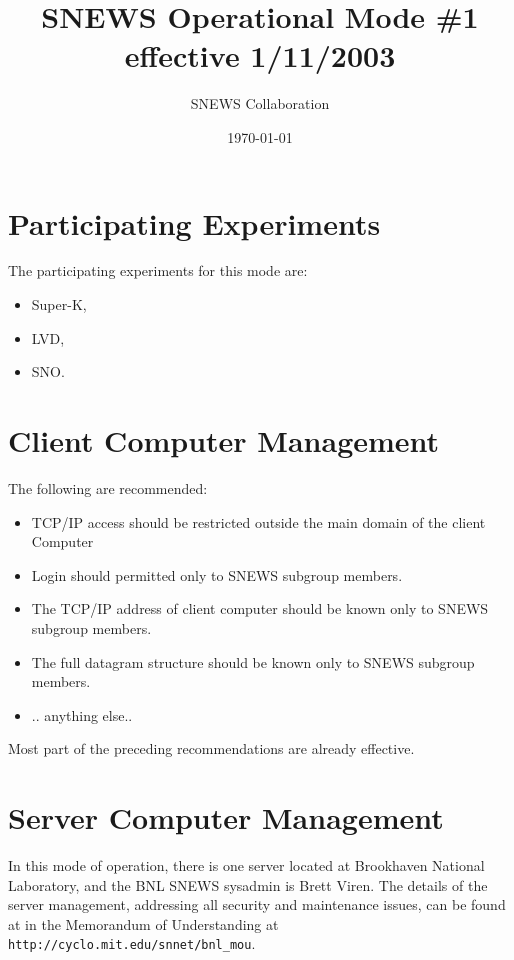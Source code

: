 \documentclass{article}
\begin{document}
\title{SNEWS Operational Mode \#1 effective 1/11/2003}         
\author{SNEWS Collaboration}
\date{\today}
\maketitle

\section{Participating Experiments}

The participating experiments for this mode are:

\begin{itemize}
\item Super-K,
\item LVD,
\item SNO.
\end{itemize}

\section{Client Computer Management}

The following are recommended:

\begin{itemize}
\item TCP/IP access should be restricted outside the main domain of the client Computer
\item Login should permitted only to SNEWS subgroup members.
\item The TCP/IP address of client computer should be known only to SNEWS subgroup members.
\item The full datagram structure should be known only to SNEWS subgroup members.
\item .. anything else..
\end{itemize}
Most part of the preceding recommendations are already effective.

\section{Server Computer Management}

In this mode of operation, there is one server located at Brookhaven
National Laboratory, and the BNL SNEWS sysadmin is Brett Viren.
The details of the server management, addressing all
security and maintenance issues, can be found at
in the Memorandum of Understanding at
{\tt http://cyclo.mit.edu/snnet/bnl\_mou}.
\end{document}
